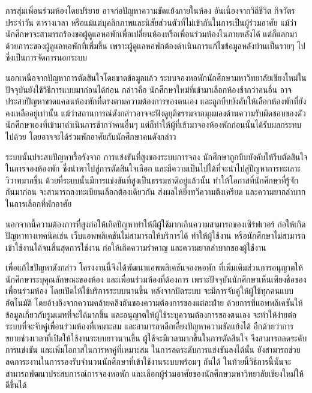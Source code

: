 การสุ่มเพื่อนร่วมห้องโดยปริยาย อาจก่อปัญหาความขัดแย้งภายในห้อง อันเนื่องจากวิถีชีวิต กิจวัตรประจำวัน ตารางเวลา หรือแม้แต่บุคลิกภาพและนิสัยส่วนตัวที่ไม่เข้ากันในการเป็นผู้ร่วมอาศัย
แม้ว่านักศึกษาจะสามารถร้องขอผู้ดูแลหอพักเพื่อเปลี่ยนห้องหรือเพื่อนร่วมห้องในภายหลังได้ แต่ก็แลกมาด้วยภาระของผู้ดูแลหอพักที่เพิ่มขึ้น เพราะผู้ดูแลหอพักต้องดำเนินการแก้ไขข้อมูลหลังบ้านเป็นรายๆ ไป ซึ่งเป็นการจัดการนอกระบบ

นอกเหนือจากปัญหาการตัดสินใจโดยขาดข้อมูลแล้ว ระบบจองหอพักนักศึกษามหาวิทยาลัยเชียงใหม่ในปัจจุบันยังใช้วิธีการแบบมาก่อนได้ก่อน กล่าวคือ นักศึกษาใหม่ที่เข้ามาเลือกห้องช้ากว่าคนอื่น อาจประสบปัญหาขาดแคลนห้องพักที่ตรงตามความต้องการของตนเอง และถูกบีบบังคับให้เลือกห้องพักที่ยังคงเหลืออยู่เท่านั้น
แม้ว่าสถานการณ์ดังกล่าวอาจจะฟังดูยุติธรรมจากมุมมองด้านความรับผิดชอบของตัวนักศึกษาเองที่เข้ามาดำเนินการช้ากว่าคนอื่นๆ แต่ก็ทำให้ผู้ที่เข้ามาจองห้องพักก่อนนั้นได้รับผลกระทบไปด้วย โดยอาจจะได้ร่วมพักอาศัยกับนักศึกษาคนดังกล่าว




ระบบนั้นประสบปัญหาเรื้อรังจาก การแข่งขันที่สูงของระบบการจอง นักศึกษาถูกบีบบังคับให้รีบตัดสินใจในการจองห้องพัก
ซึ่งนำพาไปสู่การตัดสินใจเลือก และมีความเป็นไปได้ที่จะนำไปสู่ปัญหาการทะเลาะวิวาทมากขึ้น ด้วยที่ระบบนั้นมีการแข่งขันที่สูงเป็นธรรมชาติอยู่แล้วนั้น
ทำให้โอกาสที่นักศึกษาที่รู้จักกันมาก่อน จะสามารถลงทะเบียนเลือกต้องเดียวกัน ส่งผลให้ยิ่งทวีความตึงเครียด
และความยากลำบากในการเลือกที่พักอาศัย

นอกจากนี้ความต้องการที่สูงก่อให้เกิดปัญหาทำให้มีผู้ใช้มากเกินความสามารถของเซิร์ฟเวอร์ ก่อให้เกิดปัญหาทางเทคนิคเช่น 
เว็บแอพพลิเคชันไม่สามารถให้บริการได้ ทำให้ผู้ใช้งาน หรือนักศึกษาไม่สามารถเข้าใช้งานได้จนสิ้นสุดการใช้งาน 
ก่อให้เกิดความรำคาญ และความยากลำบากของผู้ใช้งาน

เพื่อแก้ไขปัญหาดังกล่าว โครงงานนี้จึงได้พัฒนาแอพพลิเคชันจองหอพัก 
ที่เพิ่มเติมส่วนการอนุญาตให้นักศึกษาระบุคุณลักษณะของห้อง 
และเพื่อนร่วมห้องที่ต้องการ เพราะปัจจุบันนักศึกษาเห็นเพียงชื่อของเพื่อนร่วมห้อง
โดยเปิดให้ใช้บริการระบบนานขึ้น หลังจากปิดระบบ จะมีการจับคู่ให้ผู้ใช้ทุกคนแบบอัตโนมัติ 
โดยอ้างอิงจากความคล้ายคลึงกันของความต้องการของแต่ละฝ่าย
ด้วยการที่แอพพลิเคชันให้ข้อมูลเกี่ยวกับรูมเมทที่จะได้มากขึ้น และอนุญาตให้ผู้ใช้ระบุความต้องการของตนเอง 
จะทำให้ง่ายต่อระบบที่จะจับคู่เพื่อนร่วมห้องที่เหมาะสม และสามารถหลีกเลี่ยงปัญหาความขัดแย้งได้ 
อีกด้วยว่าการขยายช่วงเวลาที่เปิดให้ใช้งานระบบยาวนานขึ้น ผู้ใช้จะมีเวลามากขึ้นในการตัดสินใจ 
จึงสามารถลดระดับการแข่งขัน และเพิ่มโอกาสในการหาคู่ที่เหมาะสม ในการลดระดับการแข่งขันลงได้นั้น 
ยังสามารถช่วยลดภาระงานในการรองรับจำนวนนักศึกษาที่เข้าใช้งานระบบพร้อมๆ กันได้ 
ในท้ายนี้วิธีการนี้นั้นจะสามารถพัฒนาประสบการณ์การจองหอพัก 
และเลือกผู้ร่วมอาศัยของนักศึกษามหาวิทยาลัยเชียงใหม่ให้ดีขึ้นได้

